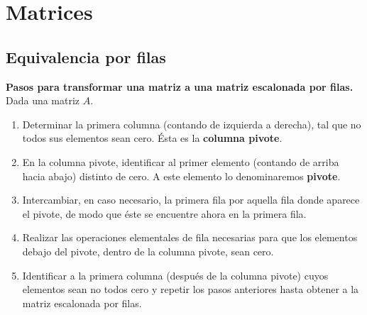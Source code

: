 \documentclass[compacto,10pt]{pubciencias-notas}
\begin{document}
\encabezado

\vspace{-8mm}

\section{Matrices}
\setcounter{subsection}{3}
\subsection{Equivalencia por filas}

\textbf{Pasos para transformar una matriz a una matriz escalonada por filas.} Dada una matriz $A$.
\begin{enumerate}
\item Determinar la primera columna (contando de izquierda a derecha), tal que no todos sus elementos sean cero. Ésta es la \textbf{columna pivote}.
\item En la columna pivote, identificar al primer elemento (contando de arriba hacia abajo) distinto de cero. A este elemento lo denominaremos \textbf{pivote}.
\item Intercambiar, en caso necesario, la primera fila por aquella fila donde aparece el pivote, de modo que éste se encuentre ahora en la primera fila.
\item Realizar las operaciones elementales de fila necesarias para que los elementos debajo del pivote, dentro de la columna pivote, sean cero.
\item Identificar a la primera columna (después de la columna pivote) cuyos elementos sean no todos cero y repetir los pasos anteriores hasta obtener a la matriz escalonada por filas.
\end{enumerate}
\end{document}
